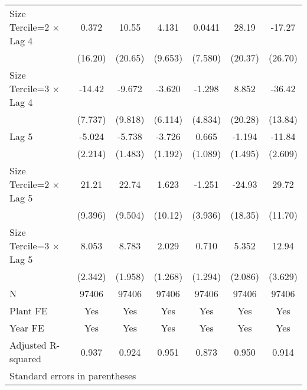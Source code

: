\begin{table}[htbp]
\begin{tabular}{l*{6}{c}}
\addlinespace
Size Tercile=2 $\times$ Lag 4&    0.372         &    10.55         &    4.131         &   0.0441         &    28.19         &   -17.27         \\
                &  (16.20)         &  (20.65)         &  (9.653)         &  (7.580)         &  (20.37)         &  (26.70)         \\
\addlinespace
Size Tercile=3 $\times$ Lag 4&   -14.42         &   -9.672         &   -3.620         &   -1.298         &    8.852         &   -36.42\sym{**} \\
                &  (7.737)         &  (9.818)         &  (6.114)         &  (4.834)         &  (20.28)         &  (13.84)         \\
\addlinespace
Lag 5           &   -5.024\sym{*}  &   -5.738\sym{***}&   -3.726\sym{**} &    0.665         &   -1.194         &   -11.84\sym{***}\\
                &  (2.214)         &  (1.483)         &  (1.192)         &  (1.089)         &  (1.495)         &  (2.609)         \\
\addlinespace
Size Tercile=2 $\times$ Lag 5&    21.21\sym{*}  &    22.74\sym{*}  &    1.623         &   -1.251         &   -24.93         &    29.72\sym{*}  \\
                &  (9.396)         &  (9.504)         &  (10.12)         &  (3.936)         &  (18.35)         &  (11.70)         \\
\addlinespace
Size Tercile=3 $\times$ Lag 5&    8.053\sym{***}&    8.783\sym{***}&    2.029         &    0.710         &    5.352\sym{*}  &    12.94\sym{***}\\
                &  (2.342)         &  (1.958)         &  (1.268)         &  (1.294)         &  (2.086)         &  (3.629)         \\
\midrule
N               &    97406         &    97406         &    97406         &    97406         &    97406         &    97406         \\
Plant FE        &      Yes         &      Yes         &      Yes         &      Yes         &      Yes         &      Yes         \\
Year FE         &      Yes         &      Yes         &      Yes         &      Yes         &      Yes         &      Yes         \\
Adjusted R-squared&    0.937         &    0.924         &    0.951         &    0.873         &    0.950         &    0.914         \\
\bottomrule
\multicolumn{7}{l}{\footnotesize Standard errors in parentheses}\\

\end{tabular}
\end{table}
